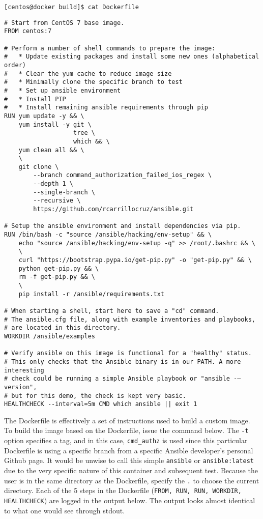\begin{verbatim}
[centos@docker build]$ cat Dockerfile
\end{verbatim}

\begin{verbatim}
# Start from CentOS 7 base image.
FROM centos:7

# Perform a number of shell commands to prepare the image:
#   * Update existing packages and install some new ones (alphabetical order)
#   * Clear the yum cache to reduce image size
#   * Minimally clone the specific branch to test
#   * Set up ansible environment
#   * Install PIP
#   * Install remaining ansible requirements through pip
RUN yum update -y && \
    yum install -y git \
                   tree \
                   which && \
    yum clean all && \
    \
    git clone \
        --branch command_authorization_failed_ios_regex \
        --depth 1 \
        --single-branch \
        --recursive \
        https://github.com/rcarrillocruz/ansible.git

# Setup the ansible environment and install dependencies via pip.
RUN /bin/bash -c "source /ansible/hacking/env-setup" && \
    echo "source /ansible/hacking/env-setup -q" >> /root/.bashrc && \
    \
    curl "https://bootstrap.pypa.io/get-pip.py" -o "get-pip.py" && \
    python get-pip.py && \
    rm -f get-pip.py && \
    \
    pip install -r /ansible/requirements.txt

# When starting a shell, start here to save a "cd" command.
# The ansible.cfg file, along with example inventories and playbooks,
# are located in this directory.
WORKDIR /ansible/examples

# Verify ansible on this image is functional for a "healthy" status.
# This only checks that the Ansible binary is in our PATH. A more interesting
# check could be running a simple Ansible playbook or "ansible -–version",
# but for this demo, the check is kept very basic.
HEALTHCHECK --interval=5m CMD which ansible || exit 1
\end{verbatim}

The Dockerfile is effectively a set of instructions used to build a custom
image. To build the image based on the Dockerfile, issue the command below.
The \verb|-t| option specifies a tag, and in this case, \verb|cmd_authz| is used since
this particular Dockerfile is using a specific branch from a specific Ansible
developer's personal Github page. It would be unwise to call this simple
\verb|ansible| or \verb|ansible:latest| due to the very specific nature of this
container and subsequent test. Because the user is in the same directory as
the Dockerfile, specify the \verb|.| to choose the current directory. Each of the 5
steps in the Dockerfile (\verb|FROM, RUN, RUN, WORKDIR, HEALTHCHECK|) are logged
in the output below. The output looks almost identical to what one would see
through stdout.

